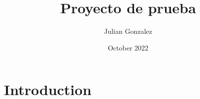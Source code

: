\documentclass{article}
\title{Proyecto de prueba}
\author{Julian Gonzalez}
\date{October 2022}
\begin{document}
\maketitle

\section{Introduction}
\end{document}
